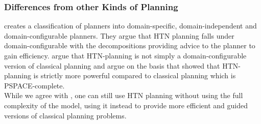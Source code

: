 \subsubsection{Differences from other Kinds of Planning}
\cite{nau2007current} creates a classification of planners into domain-specific, domain-independent and domain-configurable planners.
They argue that HTN planning falls under domain-configurable with the decompositions providing advice to the planner to gain efficiency.
\cite{holler2020htn} argue that HTN-planning is not simply a domain-configurable version of classical planning and argue on the basis that \cite{erol1994htn, erol1996complexity} showed that HTN-planning is strictly more powerful compared to classical planning which is PSPACE-complete. \\
While we agree with \cite{holler2020htn}, one can still use HTN planning without using the full complexity of the model, using it instead to provide more efficient and guided versions of classical planning problems.

